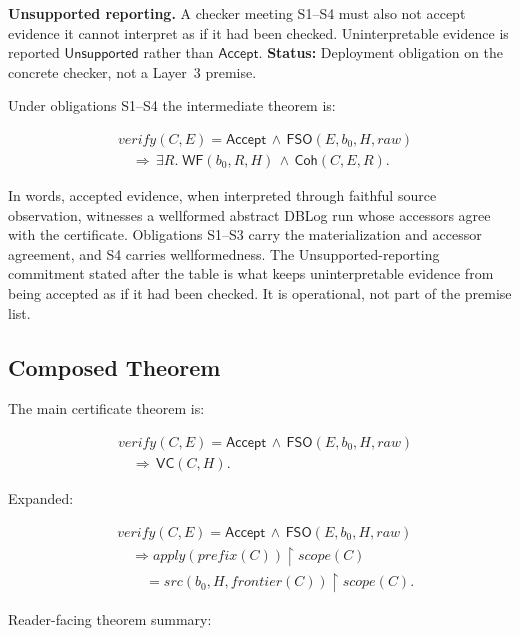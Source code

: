 \documentclass[letterpaper,10pt,twocolumn]{article}
\newcommand{\restrict}{\mathbin{\upharpoonright}}
\newcommand{\Apply}{\mathit{apply}}
\newcommand{\Src}{\mathit{src}}
\newcommand{\Scope}{\mathit{scope}}
\newcommand{\Frontier}{\mathit{frontier}}
\newcommand{\CleanPrefix}{\mathit{prefix}}
\newcommand{\Verify}{\mathit{verify}}
\newcommand{\RawObs}{\mathit{raw}}
\newcommand{\WF}{\mathsf{WF}}
\newcommand{\FSO}{\mathsf{FSO}}
\newcommand{\Coh}{\mathsf{Coh}}
\newcommand{\VC}{\mathsf{VC}}
\newcommand{\Accept}{\mathsf{Accept}}
\newcommand{\Unsupported}{\mathsf{Unsupported}}
\begin{document}
\smallskip
\noindent\textbf{Unsupported reporting.} A checker meeting S1--S4 must
also not accept evidence it cannot interpret as if it had been checked.
Uninterpretable evidence is reported $\Unsupported$ rather than
$\Accept$. \textbf{Status:} Deployment obligation on the concrete
checker, not a Layer~3 premise.

Under obligations S1--S4 the intermediate theorem is:

\[
\begin{aligned}
&\Verify(C,E)=\Accept \,\land\, \FSO(E,b_0,H,\RawObs)\\
&\quad\Longrightarrow\, \exists R.\;
   \WF(b_0,R,H) \,\land\, \Coh(C,E,R).
\end{aligned}
\]

In words, accepted evidence, when interpreted through faithful source
observation, witnesses a wellformed abstract DBLog run whose accessors
agree with the certificate. Obligations S1--S3 carry the materialization
and accessor agreement, and S4 carries wellformedness. The
Unsupported-reporting commitment stated after the table is what keeps
uninterpretable evidence from being accepted as if it had been checked.
It is operational, not part of the premise list.

\subsection{Composed Theorem}\label{composed-theorem}

The main certificate theorem is:

\[
\begin{aligned}
&\Verify(C,E)=\Accept \,\land\, \FSO(E,b_0,H,\RawObs)\\
&\quad\Longrightarrow\, \VC(C,H).
\end{aligned}
\]

Expanded:

\[
\begin{aligned}
&\Verify(C,E)=\Accept \,\land\, \FSO(E,b_0,H,\RawObs)\\
&\quad\Longrightarrow
  \Apply(\CleanPrefix(C)) \restrict \Scope(C)\\
&\qquad= \Src(b_0,H,\Frontier(C)) \restrict \Scope(C).
\end{aligned}
\]

Reader-facing theorem summary:
\end{document}
